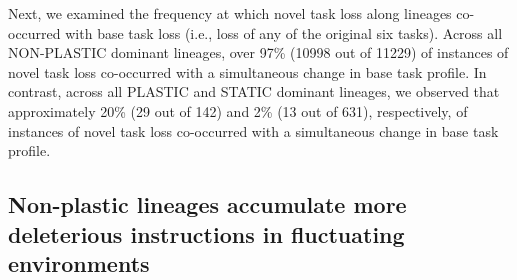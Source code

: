 Next, we examined the frequency at which novel task loss along lineages co-occurred with base task loss (i.e., loss of any of the original six tasks).
Across all NON-PLASTIC dominant lineages, over 97\% (10998 out of 11229) of instances of novel task loss co-occurred with a simultaneous change in base task profile.
In contrast, across all PLASTIC and STATIC dominant lineages, we observed that approximately 20\% (29 out of 142) and 2\% (13 out of 631), respectively, of instances of novel task loss co-occurred with a simultaneous change in base task profile. 


\vspace{0.5cm}
\subsection{Non-plastic lineages accumulate more deleterious instructions in fluctuating environments}



